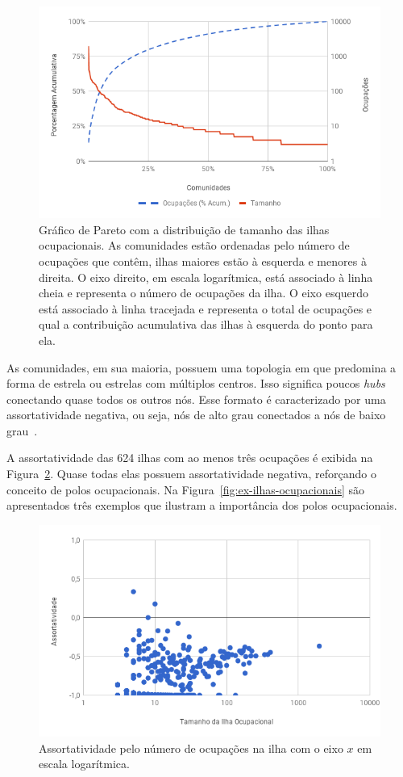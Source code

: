\documentclass[
  article,
  11pt,
  a4paper,
  english,
  brazil,
  sumario=tradicional]{abntex2}
\begin{document}
\begin{figure}[htb]
    \centering
    \includegraphics[width=0.9\linewidth]{pareto-comunidades.png}
    \caption{Gráfico de Pareto com a distribuição de tamanho das ilhas ocupacionais. As comunidades estão ordenadas pelo número de ocupações que contêm, ilhas maiores estão à esquerda e menores à direita. O eixo direito, em escala logarítmica, está associado à linha cheia e representa o número de ocupações da ilha. O eixo esquerdo está associado à linha tracejada e representa o total de ocupações e qual a contribuição acumulativa das ilhas à esquerda do ponto para ela.}
    \label{fig:pareto-comunidades}
\end{figure}

As comunidades, em sua maioria, possuem uma topologia em que predomina a forma de estrela ou estrelas com múltiplos centros. Isso significa poucos \textit{hubs} conectando quase todos os outros nós. Esse formato é caracterizado por uma assortatividade negativa, ou seja, nós de alto grau conectados a nós de baixo grau~\cite{Barabasi2016-rn}.

A assortatividade das 624 ilhas com ao menos três ocupações é exibida na Figura~\ref{fig:assortatividade}. Quase todas elas possuem assortatividade negativa, reforçando o conceito de polos ocupacionais. Na Figura~\ref{fig:ex-ilhas-ocupacionais} são apresentados três exemplos que ilustram a importância dos polos ocupacionais.

\begin{figure}[htb]
    \centering
    \includegraphics[width=0.9\linewidth]{assortatividade.png}
    \caption{Assortatividade pelo número de ocupações na ilha com o eixo $x$ em escala logarítmica.}
    \label{fig:assortatividade}
\end{figure}
\end{document}

